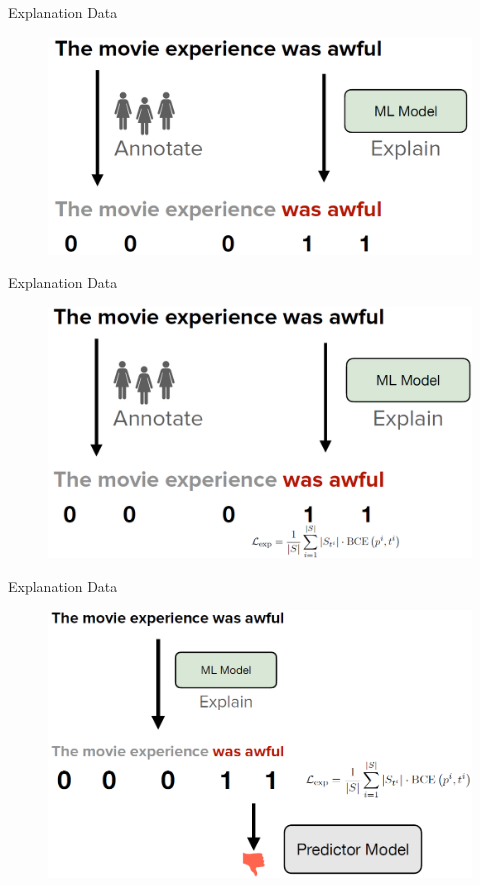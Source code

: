 \documentclass[11pt,compress,t,notes=noshow, aspectratio=169, xcolor=table]{beamer}
\begin{document}
\begin{frame}{Explanation Data}
    \begin{figure}
    \includegraphics[width=0.6\linewidth]{bild13}
    \end{figure}
\end{frame}

\begin{frame}{Explanation Data}
    \begin{figure}
    \includegraphics[width=0.6\linewidth]{bild14}
    \end{figure}
\end{frame}


\begin{frame}{Explanation Data}
    \begin{figure}
    \includegraphics[width=0.7\linewidth]{bild15}
    \end{figure}
\end{frame}
\end{document}
